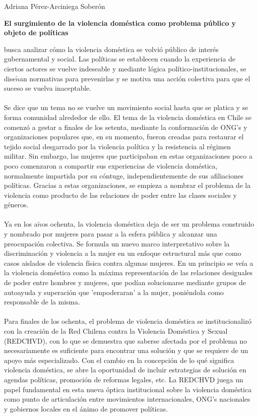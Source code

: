 \documentclass[10pt,spanish,letterpaper]{article}
\theoremstyle{plain}
\begin{document}
\begin{flushleft}
Adriana P\'erez-Arciniega Sober\'on
\end{flushleft}
\begin{center}
\textbf{El surgimiento de la violencia dom\'estica como problema p\'ublico y objeto de pol\'iticas}
\end{center}
\cite{araujo2000surgimiento} busca analizar c\'omo la violencia dom\'estica se volvi\'o p\'ublico de inter\'es gubernamental y social. Las pol\'iticas se establecen cuando la experiencia de ciertos actores se vuelve indeseable y mediante l\'ogica pol\'itico-institucionales, se dise$\tilde{n}$an normativas para prevenirlas y se motiva una acci\'on colectiva para que el suceso se vuelva inaceptable.\\
\\
Se dice que un tema no se vuelve un movimiento social hasta que se platica y se forma comunidad alrededor de ello. El tema de la violencia dom\'estica en Chile se comenz\'o a gestar a finales de los setenta, mediante la conformaci\'on de ONG's y organizaciones populares que, en su momento, fueron creadas para restaurar el tejido social desgarrado por la violencia pol\'itica y la resistencia al r\'egimen militar. Sin embargo, las mujeres que participaban en estas organizaciones poco a poco comenzaron a compartir sus experiencias de violencia dom\'estica, normalmente impartida por su c\'ontuge, independientemente de sus afiliaciones pol\'iticas. Gracias a estas organizaciones, se empieza a nombrar el problema de la violencia como producto de las relaciones de poder entre las clases sociales y g\'eneros.\\
\\
Ya en los a$\tilde{n}$os ochenta, la violencia dom\'estica deja de ser un problema construido y nombrado por mujeres para pasar a la esfera p\'ublica y alcanzar una preocupaci\'on colectiva. Se formula un nuevo marco interpretativo sobre la discriminaci\'on y violencia a la mujer en un enfoque estructural m\'as que como casos aislados de violencia f\'isica contra algunas mujeres. En un principio se ve\'ia a la violencia dom\'estica como la m\'axima representaci\'on de las relaciones desiguales de poder entre hombres y mujeres, que pod\'ian solucionarse mediante grupos de autoayuda y superaci\'on que 'empoderaran' a la mujer, poni\'endola como responsable de la misma.\\
\\
Para finales de los ochenta, el problema de violencia dom\'estica se institucionaliz\'o con la creaci\'on de la Red Chilena contra la Violencia Dom\'estica y Sexual (REDCHVD), con lo que se demuestra que saberse afectada por el problema no necesariamente es suficiente para encontrar una soluci\'on y que se requiere de un apoyo m\'as especializado. Con el cambio en la concepci\'on de lo qu\'e significa violencia dom\'estica, se abre la oportunidad de incluir estrategias de soluci\'on en agendas pol\'iticas, promoci\'on de reformas legales, etc. La REDCHVD juega un papel fundamental en esta nueva \'optica institucional sobre la violencia dom\'estica como punto de articulaci\'on entre movimientos internacionales, ONG's nacionales y gobiernos locales en el \'animo de promover pol\'iticas.\\
\end{document}
